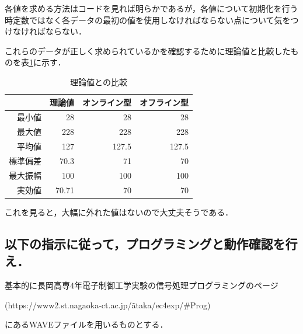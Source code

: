\documentclass[titlepage]{jarticle}
\begin{document}
各値を求める方法はコードを見れば明らかであるが，各値について初期化を行う時定数ではなく各データの最初の値を使用しなければならない点について気をつけなければならない．

これらのデータが正しく求められているかを確認するために理論値と比較したものを表\ref{hikaku}に示す．
\begin{table}[H]
  \caption{理論値との比較}
  \label{hikaku}
  \centering
  \begin{tabular}{r|rrr}
    \hline
             & 理論値 & オンライン型 & オフライン型 \\\hline\hline
    最小値   & 28     & 28           & 28           \\
    最大値   & 228    & 228          & 228          \\
    平均値   & 127    & 127.5        & 127.5        \\
    標準偏差 & 70.3   & 71           & 70           \\
    最大振幅 & 100    & 100          & 100          \\
    実効値   & 70.71  & 70           & 70           \\\hline
  \end{tabular}
\end{table}

これを見ると，大幅に外れた値はないので大丈夫そうである．
\subsection{以下の指示に従って，プログラミングと動作確認を行え．}
基本的に長岡高専4年電子制御工学実験の信号処理プログラミングのページ

(https://www2.st.nagaoka-ct.ac.jp/\~ataka/ec4exp/\#Prog)

にあるWAVEファイルを用いるものとする．
\end{document}
